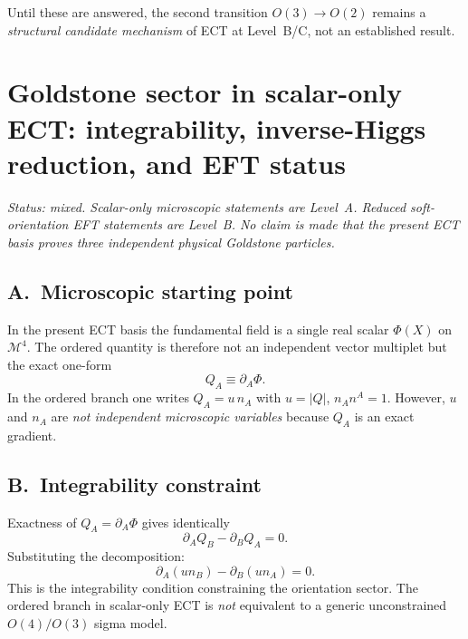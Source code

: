\documentclass[11pt,a4paper]{article}
\numberwithin{equation}{section}
\begin{document}
Until these are answered, the second transition $O(3)\to O(2)$
remains a \emph{structural candidate mechanism} of ECT at
Level~B/C, not an established result.

\section{Goldstone sector in scalar-only ECT: integrability,
inverse-Higgs reduction, and EFT status}
\label{app:goldstone_integrability}

\textit{Status: mixed.
Scalar-only microscopic statements are Level~A.
Reduced soft-orientation EFT statements are Level~B.
No claim is made that the present ECT basis proves three independent
physical Goldstone particles.}

\subsection*{A.\ Microscopic starting point}

In the present ECT basis the fundamental field is a single real scalar
$\Phi(X)$ on $\mathcal{M}^4$.
The ordered quantity is therefore not an independent vector multiplet
but the exact one-form
\begin{equation}
  Q_A \equiv \partial_A\Phi.
  \label{eq:app_QA_def}
\end{equation}
In the ordered branch one writes $Q_A=u\,n_A$ with $u=|Q|$,
$n_A n^A=1$.
However, $u$ and $n_A$ are \emph{not independent microscopic variables}
because $Q_A$ is an exact gradient.

\subsection*{B.\ Integrability constraint}

Exactness of $Q_A=\partial_A\Phi$ gives identically
\begin{equation}
  \partial_A Q_B - \partial_B Q_A = 0.
  \label{eq:app_exactness}
\end{equation}
Substituting the decomposition:
\begin{equation}
  \partial_A(u n_B)-\partial_B(u n_A)=0.
  \label{eq:app_un_integrability}
\end{equation}
This is the integrability condition constraining the orientation sector.
The ordered branch in scalar-only ECT is \emph{not} equivalent to a
generic unconstrained $O(4)/O(3)$ sigma model.
\end{document}
